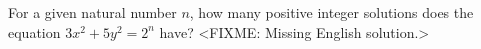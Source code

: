 \problem{}
For a given natural number $n$, how many positive integer solutions does the
equation $3 x^2 + 5 y^2 = 2^n$ have?
\solution
<FIXME: Missing English solution.>
\endproblem
